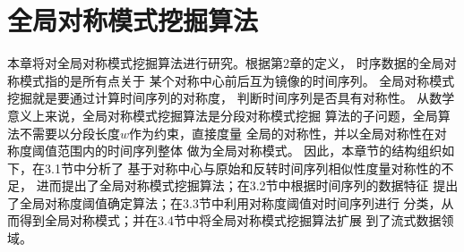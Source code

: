 
\chapter{全局对称模式挖掘算法}

本章将对全局对称模式挖掘算法进行研究。根据第2章的定义，
时序数据的全局对称模式指的是所有点关于
某个对称中心前后互为镜像的时间序列。
全局对称模式挖掘就是要通过计算时间序列的对称度，
判断时间序列是否具有对称性。
从数学意义上来说，全局对称模式挖掘算法是分段对称模式挖掘
算法的子问题，全局算法不需要以分段长度$w$作为约束，直接度量
全局的对称性，并以全局对称性在对称度阈值范围内的时间序列整体
做为全局对称模式。
因此，本章节的结构组织如下，在3.1节中分析了
基于对称中心与原始和反转时间序列相似性度量对称性的不足，
进而提出了全局对称模式挖掘算法；在3.2节中根据时间序列的数据特征
提出了全局对称度阈值确定算法；在3.3节中利用对称度阈值对时间序列进行
分类，从而得到全局对称模式；并在3.4节中将全局对称模式挖掘算法扩展
到了流式数据领域。

